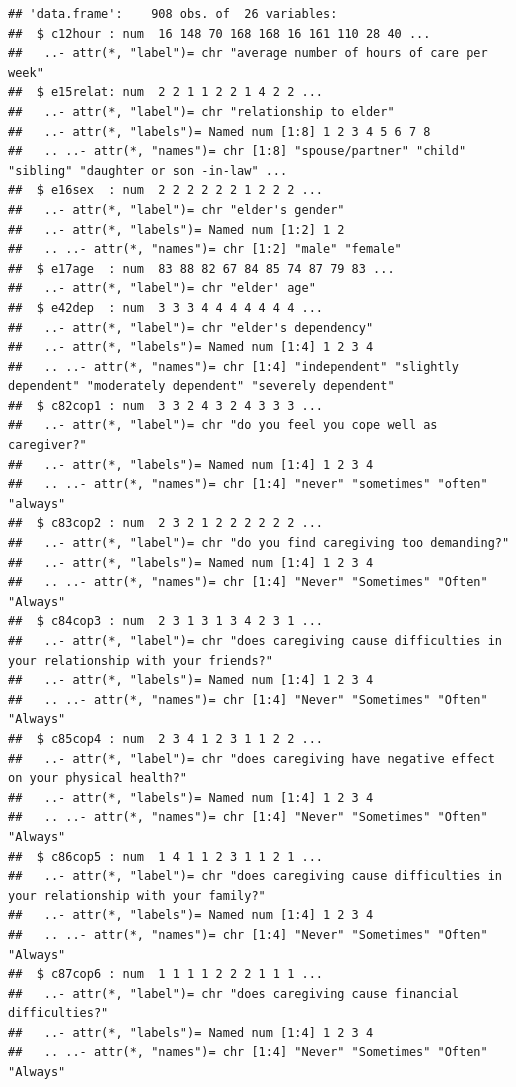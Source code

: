\documentclass[
]{article}
\begin{document}
\begin{verbatim}
## 'data.frame':    908 obs. of  26 variables:
##  $ c12hour : num  16 148 70 168 168 16 161 110 28 40 ...
##   ..- attr(*, "label")= chr "average number of hours of care per week"
##  $ e15relat: num  2 2 1 1 2 2 1 4 2 2 ...
##   ..- attr(*, "label")= chr "relationship to elder"
##   ..- attr(*, "labels")= Named num [1:8] 1 2 3 4 5 6 7 8
##   .. ..- attr(*, "names")= chr [1:8] "spouse/partner" "child" "sibling" "daughter or son -in-law" ...
##  $ e16sex  : num  2 2 2 2 2 2 1 2 2 2 ...
##   ..- attr(*, "label")= chr "elder's gender"
##   ..- attr(*, "labels")= Named num [1:2] 1 2
##   .. ..- attr(*, "names")= chr [1:2] "male" "female"
##  $ e17age  : num  83 88 82 67 84 85 74 87 79 83 ...
##   ..- attr(*, "label")= chr "elder' age"
##  $ e42dep  : num  3 3 3 4 4 4 4 4 4 4 ...
##   ..- attr(*, "label")= chr "elder's dependency"
##   ..- attr(*, "labels")= Named num [1:4] 1 2 3 4
##   .. ..- attr(*, "names")= chr [1:4] "independent" "slightly dependent" "moderately dependent" "severely dependent"
##  $ c82cop1 : num  3 3 2 4 3 2 4 3 3 3 ...
##   ..- attr(*, "label")= chr "do you feel you cope well as caregiver?"
##   ..- attr(*, "labels")= Named num [1:4] 1 2 3 4
##   .. ..- attr(*, "names")= chr [1:4] "never" "sometimes" "often" "always"
##  $ c83cop2 : num  2 3 2 1 2 2 2 2 2 2 ...
##   ..- attr(*, "label")= chr "do you find caregiving too demanding?"
##   ..- attr(*, "labels")= Named num [1:4] 1 2 3 4
##   .. ..- attr(*, "names")= chr [1:4] "Never" "Sometimes" "Often" "Always"
##  $ c84cop3 : num  2 3 1 3 1 3 4 2 3 1 ...
##   ..- attr(*, "label")= chr "does caregiving cause difficulties in your relationship with your friends?"
##   ..- attr(*, "labels")= Named num [1:4] 1 2 3 4
##   .. ..- attr(*, "names")= chr [1:4] "Never" "Sometimes" "Often" "Always"
##  $ c85cop4 : num  2 3 4 1 2 3 1 1 2 2 ...
##   ..- attr(*, "label")= chr "does caregiving have negative effect on your physical health?"
##   ..- attr(*, "labels")= Named num [1:4] 1 2 3 4
##   .. ..- attr(*, "names")= chr [1:4] "Never" "Sometimes" "Often" "Always"
##  $ c86cop5 : num  1 4 1 1 2 3 1 1 2 1 ...
##   ..- attr(*, "label")= chr "does caregiving cause difficulties in your relationship with your family?"
##   ..- attr(*, "labels")= Named num [1:4] 1 2 3 4
##   .. ..- attr(*, "names")= chr [1:4] "Never" "Sometimes" "Often" "Always"
##  $ c87cop6 : num  1 1 1 1 2 2 2 1 1 1 ...
##   ..- attr(*, "label")= chr "does caregiving cause financial difficulties?"
##   ..- attr(*, "labels")= Named num [1:4] 1 2 3 4
##   .. ..- attr(*, "names")= chr [1:4] "Never" "Sometimes" "Often" "Always"

\end{verbatim}
\end{document}
